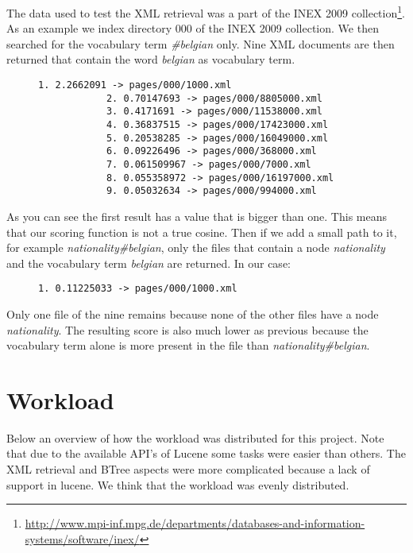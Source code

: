 \documentclass{article}
\begin{document}
The data used to test the XML retrieval was a part of the INEX 2009 collection\footnote{\url{http://www.mpi-inf.mpg.de/departments/databases-and-information-systems/software/inex/}}.
As an example we index directory 000 of the INEX 2009 collection.
We then searched for the vocabulary term \emph{\#belgian} only. Nine XML documents are then returned that contain the word \emph{belgian} as vocabulary term.
\begin{figure}[H]
	\begin{minipage}{0.5\textwidth}
		\centering
		\begin{lstlisting}[basicstyle=\tiny\ttfamily, caption={Search results for \#belgian}]
			1. 2.2662091 -> pages/000/1000.xml
			2. 0.70147693 -> pages/000/8805000.xml
			3. 0.4171691 -> pages/000/11538000.xml
			4. 0.36837515 -> pages/000/17423000.xml
			5. 0.20538285 -> pages/000/16049000.xml
			6. 0.09226496 -> pages/000/368000.xml
			7. 0.061509967 -> pages/000/7000.xml
			8. 0.055358972 -> pages/000/16197000.xml
			9. 0.05032634 -> pages/000/994000.xml
		\end{lstlisting}
	\end{minipage}
\end{figure}
As you can see the first result has a value that is bigger than one. This means that our scoring function is not a true cosine.
Then if we add a small path to it, for example \emph{nationality\#belgian}, only the files that contain a node \emph{nationality} and the vocabulary term \emph{belgian}
are returned.
In our case:
\begin{figure}[H]
	\begin{minipage}{0.5\textwidth}
		\centering
		\begin{lstlisting}[basicstyle=\tiny\ttfamily, caption={Search results for nationality\#belgian}]
			1. 0.11225033 -> pages/000/1000.xml
		\end{lstlisting}
	\end{minipage}
\end{figure}
Only one file of the nine remains because none of the other files have a node \emph{nationality}.
The resulting score is also much lower as previous because the vocabulary term alone is more present in the file than \emph{nationality\#belgian}.

\section{Workload}
Below an overview of how the workload was distributed for this project. Note that due to the available API's of Lucene some tasks were easier than others. The XML retrieval and BTree aspects were more complicated because a lack of support in lucene. We think that the workload was evenly distributed.
\end{document}
